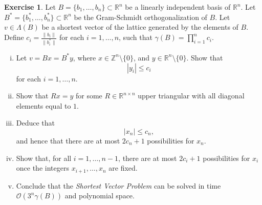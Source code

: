 \documentclass[12pt,a4paper]{article}
\theoremstyle{plain}
\newtheorem*{Sol*}{Solution}
\theoremstyle{definition}
\newtheorem{Ex}{Exercise}
\def \R {\mathbb R}
\def \Z {\mathbb Z}
\newif\ifsolutions
\newcommand{\exercise}[2]{
			\begin{Ex} #1 \end{Ex}
			\ifsolutions  \begin{Sol*} #2 \end{Sol*} \bigskip \else \bigskip  \fi
		}
\begin{document}
\exercise{
	Let $B = \{b_1,\dots,b_n\} \subset \R^n$ be a linearly independent basis of $\R^n$. 
	Let $B^* = \{b_1^*,\dots,b_n^*\} \subset \R^n$ be the Gram-Schmidt orthogonalization of $B$.
	Let $v \in \Lambda(B)$ be a shortest vector of the lattice generated by the elements of $B$.
	Define $c_i =  \frac{\| b_i \|}{\| b_i^* \|}$ for each $i = 1, \dots, n$, such that $\gamma(B) = \prod_{i=1}^n c_i$.
	\begin{enumerate}[i)]
		\item Let $v = Bx = B^*y$, where $x \in \Z^{n} \setminus \{0\}$, and $y \in \R^{n} \setminus \{0\}$.
		Show that
			\[ | y_i | \leq c_i \]
		for each $i=1, \dots, n$.
		\item Show that $ Rx = y$ for some $R \in \R^{n \times n}$ upper triangular with all diagonal elements equal to $1$.
		\item Deduce that 
			\[ | x_n | \leq c_n, \]
		and hence that there are at most $2c_n + 1$ possibilities for $x_n$.
		\item Show that, for all $i=1, \dots, n-1$, there are at most $2 c_i + 1$ possibilities for $x_i$ once the integers $x_{i+1}, \dots, x_n$ are fixed.
		\item Conclude that the \emph{Shortest Vector Problem} can be solved in time $\mathcal{O}\left(3^n \gamma(B)\right)$ and polynomial space.
	\end{enumerate}
}
{}
\end{document}
